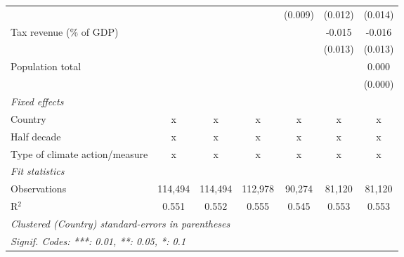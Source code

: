 \begin{tabular}{lcccccc}
                                        &               &                &               & (0.009)        & (0.012)        & (0.014)\\   
   Tax revenue (\% of GDP)              &               &                &               &                & -0.015         & -0.016\\   
                                        &               &                &               &                & (0.013)        & (0.013)\\   
   Population total                     &               &                &               &                &                & 0.000\\   
                                        &               &                &               &                &                & (0.000)\\   
   \emph{Fixed effects}\\
   Country                              & x             & x              & x             & x              & x              & x\\  
   Half decade                          & x             & x              & x             & x              & x              & x\\  
   Type of climate action/measure       & x             & x              & x             & x              & x              & x\\  
   \midrule \emph{Fit statistics}\\
   Observations                         & 114,494       & 114,494        & 112,978       & 90,274         & 81,120         & 81,120\\  
   R$^2$                                & 0.551         & 0.552          & 0.555         & 0.545          & 0.553          & 0.553\\  
   \midrule
   \multicolumn{7}{l}{\emph{Clustered (Country) standard-errors in parentheses}}\\
   \multicolumn{7}{l}{\emph{Signif. Codes: ***: 0.01, **: 0.05, *: 0.1}}\\
\end{tabular}
\par\endgroup


